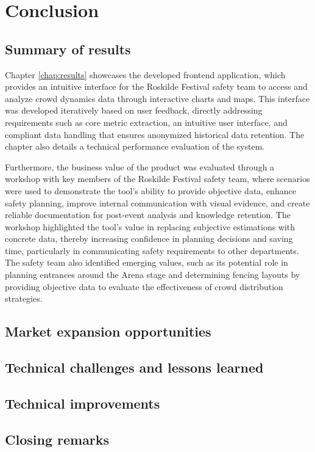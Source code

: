 \chapter{Conclusion}

\section{Summary of results}

Chapter \ref{chap:results} showcases the developed frontend application, which provides an intuitive interface for the Roskilde Festival safety team to access and analyze crowd dynamics data through interactive charts and maps. This interface was developed iteratively based on user feedback, directly addressing requirements such as core metric extraction, an intuitive user interface, and compliant data handling that ensures anonymized historical data retention. The chapter also details a technical performance evaluation of the system.



Furthermore, the business value of the product was evaluated through a workshop with key members of the Roskilde Festival safety team, where scenarios were used to demonstrate the tool's ability to provide objective data, enhance safety planning, improve internal communication with visual evidence, and create reliable documentation for post-event analysis and knowledge retention. The workshop highlighted the tool's value in replacing subjective estimations with concrete data, thereby increasing confidence in planning decisions and saving time, particularly in communicating safety requirements to other departments. The safety team also identified emerging values, such as its potential role in planning entrances around the Arena stage and determining fencing layouts by providing objective data to evaluate the effectiveness of crowd distribution strategies.

\section{Market expansion opportunities}

\section{Technical challenges and lessons learned}

\section{Technical improvements}

\section{Closing remarks}